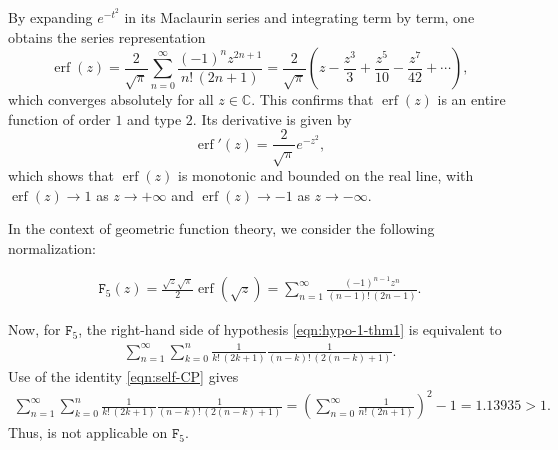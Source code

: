 \documentclass[a4paper,11pt,reqno]{amsart}
\begin{document}
By expanding $e^{-t^2}$ in its Maclaurin series and integrating term by term, one obtains the series representation
\begin{equation}\label{eq:erf-series}
\operatorname{erf}(z) = \frac{2}{\sqrt{\pi}} \sum_{n=0}^{\infty} \frac{(-1)^{n} z^{2n+1}}{n!\,(2n+1)}
= \frac{2}{\sqrt{\pi}} \left( z - \frac{z^{3}}{3} + \frac{z^{5}}{10} - \frac{z^{7}}{42} + \cdots \right),
\end{equation}
which converges absolutely for all $z \in \mathbb{C}$. This confirms that $\operatorname{erf}(z)$ is an entire function of order $1$ and type $2$. Its derivative is given by
\[
\operatorname{erf}'(z) = \frac{2}{\sqrt{\pi}} e^{-z^2},
\]
which shows that $\operatorname{erf}(z)$ is monotonic and bounded on the real line, with $\operatorname{erf}(z) \to 1$ as $z \to +\infty$ and $\operatorname{erf}(z) \to -1$ as $z \to -\infty$.

In the context of geometric function theory, we consider the following normalization:

\begin{align}\label{eq:erf-normalizations}
\mathtt{F}_{5}(z) = \frac{\sqrt{z} \sqrt{\pi}}{2 }\operatorname{erf}(\sqrt{z})=  \sum_{n=1}^{\infty} \frac{(-1)^{n-1} z^{n}}{(n-1)!\,(2n-1)}.
\end{align}

Now, for $\mathtt{F}_{5}$, the right-hand side of hypothesis \eqref{eqn:hypo-1-thm1} is equivalent to 
\begin{align}
  \sum_{n=1}^{\infty} \sum_{k=0}^n \frac{1}{k!\,(2k+1)} \frac{1}{(n-k)!\,(2(n-k)+1)}.   
\end{align}
 Use of the identity \eqref{eqn:self-CP} gives
\begin{align}
  \sum_{n=1}^{\infty} \sum_{k=0}^n \frac{1}{k!\,(2k+1)} \frac{1}{(n-k)!\,(2(n-k)+1)}= \left(\sum_{n=0}^{\infty} \frac{1}{n!\,(2n+1)} \right)^2 -1=1.13935>1. 
\end{align}
Thus,  is not applicable on $\mathtt{F}_{5}$.
\end{document}
